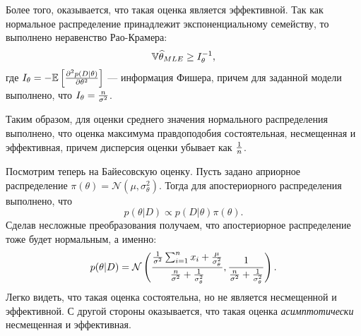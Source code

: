 \begin{example}
Более того, оказывается, что такая оценка является эффективной.
Так как нормальное распределение принадлежит экспоненциальному семейству, то выполнено неравенство Рао-Крамера:
\[
\mathbb{V} \widehat{\theta}_{MLE} \geq I_{\theta}^{-1},
\]
где $I_{\theta} = - \mathbb{E}  \left[\frac{\partial^2 p(D|\theta)}{\partial \theta^2} \right]$ --- информация Фишера,
причем для заданной модели выполнено, что $I_{\theta} = \frac{n}{\sigma^2}$.

Таким образом, для оценки среднего значения нормального распределения выполнено, что
оценка максимума правдоподобия состоятельная, несмещенная и эффективная, причем 
дисперсия оценки убывает как $\frac{1}{n}$.

Посмотрим теперь на Байесовскую оценку.
Пусть задано априорное распределение $\pi(\theta) = \mathcal{N}(\mu, \sigma_{\theta}^2)$.
Тогда для апостериорного распределения выполнено, что
\[
p(\theta | D) \propto p(D| \theta) \pi(\theta).
\] 
Сделав несложные преобразования получаем, что
апостериорное распределение тоже будет нормальным, а именно:
\[
p(\theta | D) = \mathcal{N} \left(\frac{\frac{1}{\sigma^2} \sum_{i = 1}^{n} x_i + \frac{\mu}{\sigma_{\theta}^2}}{\frac{n}{\sigma^2} + \frac{1}{\sigma_{\theta}^2}}, \frac{1}{\frac{n}{\sigma^2} + \frac{1}{\sigma_{\theta}^2}} \right).
\] 
Легко видеть, что такая оценка состоятельна, но не является несмещенной и эффективной.
С другой стороны оказывается, что такая оценка \emph{асимптотически} несмещенная и эффективная.
\end{example}

 
